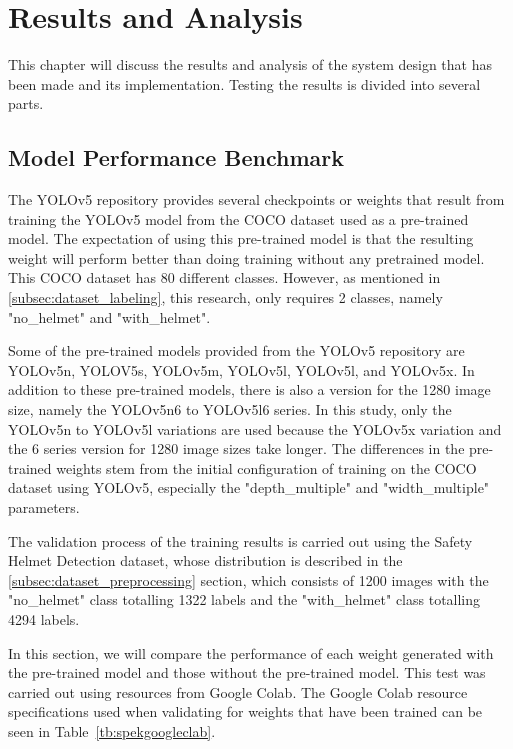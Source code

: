 \section{Results and Analysis}
\label{sec:resultnanalysis}

\par This chapter will discuss the results and analysis of the system design that has been made and its implementation. Testing the results is divided into several parts.

\subsection{Model Performance Benchmark}
\label{subsec:modeltest}

\par The YOLOv5 repository provides several checkpoints or weights that result from training the YOLOv5 model from the COCO dataset used as a pre-trained model. The expectation of using this pre-trained model is that the resulting weight will perform better than doing training without any pretrained model. This COCO dataset has 80 different classes. However, as mentioned in \ref{subsec:dataset_labeling}, this research, only requires 2 classes, namely "no\_helmet" and "with\_helmet".

\par Some of the pre-trained models provided from the YOLOv5 repository are YOLOv5n, YOLOV5s, YOLOv5m, YOLOv5l, YOLOv5l, and YOLOv5x. In addition to these pre-trained models, there is also a version for the 1280 image size, namely the YOLOv5n6 to YOLOv5l6 series. In this study, only the YOLOv5n to YOLOv5l variations are used because the YOLOv5x variation and the 6 series version for 1280 image sizes take longer. The differences in the pre-trained weights stem from the initial configuration of training on the COCO dataset using YOLOv5, especially the "depth\_multiple" and "width\_multiple" parameters.

\par The validation process of the training results is carried out using the Safety Helmet Detection dataset, whose distribution is described in the \ref{subsec:dataset_preprocessing} section, which consists of 1200 images with the "no\_helmet" class totalling 1322 labels and the "with\_helmet" class totalling 4294 labels.

\par In this section, we will compare the performance of each weight generated with the pre-trained model and those without the pre-trained model. This test was carried out using resources from Google Colab. The Google Colab resource specifications used when validating for weights that have been {trained} can be seen in Table~\ref{tb:spekgoogleclab}.

